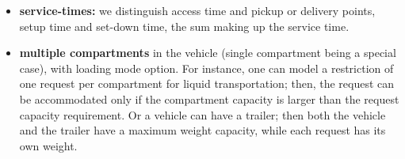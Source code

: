 \documentclass[12pt,a4paper]{article}
\begin{document}
\begin{itemize}
\item {\bf  service-times:} we distinguish access time and pickup or delivery points, setup time and set-down time, the sum making up the service time.
\item {\bf multiple compartments} in the vehicle (single compartment being a special case), with loading mode option. For instance, one can model a restriction of one request per compartment for liquid transportation; then, the request can be accommodated only if the compartment capacity is larger than the request capacity requirement. Or a vehicle can have a trailer; then both the vehicle and the trailer have a maximum weight capacity, while each request has its own weight. 
\end{itemize}

\noindent 
\end{document}
